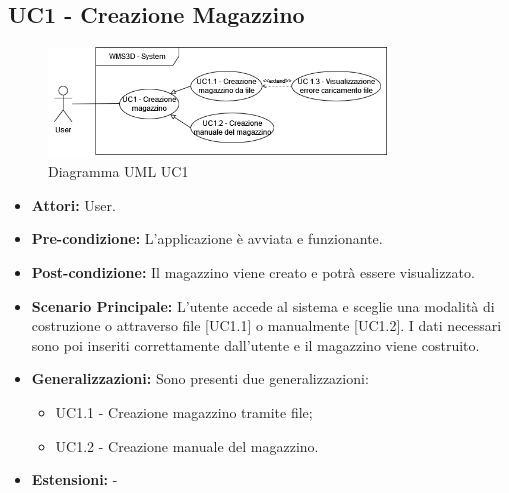\subsection{UC1 - Creazione Magazzino}
\begin{figure}[H]
    \centering
    \includegraphics[width=0.8\textwidth]{UC_diagrams_1-10/UC1_sys.drawio.png}
    \caption{Diagramma UML UC1}
\end{figure}
\begin{itemize}
    \item \textbf{Attori:} User.
    \item \textbf{Pre-condizione:} L'applicazione è avviata e funzionante.
    \item \textbf{Post-condizione:} Il magazzino viene creato e potrà essere visualizzato.
    \item \textbf{Scenario Principale:}  L’utente accede al sistema e sceglie una modalità di costruzione o attraverso file [UC1.1] o manualmente [UC1.2]. I dati necessari sono poi inseriti correttamente dall'utente e il magazzino viene costruito.
    \item \textbf{Generalizzazioni:} Sono presenti due generalizzazioni: 
    \begin{itemize}
        \item UC1.1 - Creazione magazzino tramite file;
        \item UC1.2 - Creazione manuale del magazzino.
    \end{itemize}
    \item \textbf{Estensioni:} -
\end{itemize}


